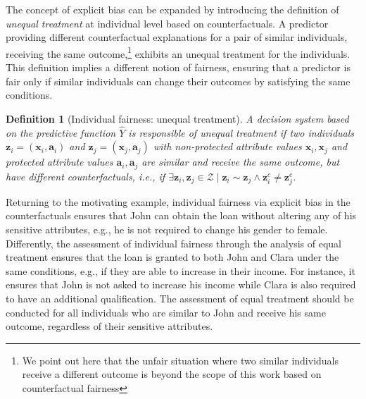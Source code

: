 \documentclass[letterpaper]{article} %
\newtheorem{definition}{Definition}
\begin{document}
The concept of explicit bias can be expanded by introducing the definition of \emph{unequal treatment} at individual level based on counterfactuals.
%
A predictor providing different counterfactual explanations for a pair of similar individuals, receiving the same outcome,\footnote{We point out here that the unfair situation where two similar individuals receive a different outcome is beyond the scope of this work based on counterfactual fairness} exhibits an unequal treatment for the individuals.
%
This definition implies a different notion of fairness, ensuring that a predictor is fair only if similar individuals can change their outcomes by satisfying the same conditions. 

\begin{definition}[Individual fairness: unequal treatment]\label{unequal_treatment}
	A decision system based on the predictive function $\hat{Y}$ is responsible of \emph{unequal treatment} if two individuals $\boldsymbol{z}_i = (\boldsymbol{x}_i, \boldsymbol{a}_i)$ and $\boldsymbol{z}_j = (\boldsymbol{x}_j, \boldsymbol{a}_j)$ with non-protected attribute values $\boldsymbol{x}_i, \boldsymbol{x}_j$ and protected attribute values $\boldsymbol{a}_i, \boldsymbol{a}_j$ are similar and receive the same outcome, but have different counterfactuals, i.e., if $\exists \boldsymbol{z}_i, \boldsymbol{z}_j \in \mathcal{Z} \mid \boldsymbol{z}_i \sim \boldsymbol{z}_j \wedge \boldsymbol{z}_i^c \neq \boldsymbol{z}_j^c$.
\end{definition}

Returning to the motivating example, individual fairness via explicit bias in the counterfactuals ensures that John can obtain the loan without altering any of his sensitive attributes, e.g., he is not required to change his gender to female.
%
Differently, the assessment of individual fairness through the analysis of equal treatment ensures that the loan is granted to both John and Clara under the same conditions, e.g., if they are able to increase in their income. For instance, it ensures that John is not asked to increase his income while Clara is also required to have an additional qualification.
%
The assessment of equal treatment should be conducted for all individuals who are similar to John and receive his same outcome, regardless of their sensitive attributes.
\end{document}
